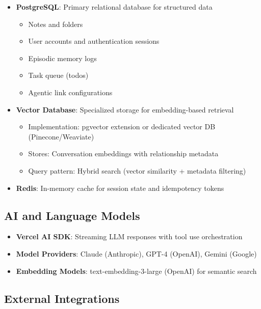 \begin{itemize}
    \item \textbf{PostgreSQL}: Primary relational database for structured data
    \begin{itemize}
        \item Notes and folders
        \item User accounts and authentication sessions
        \item Episodic memory logs
        \item Task queue (todos)
        \item Agentic link configurations
    \end{itemize}

    \item \textbf{Vector Database}: Specialized storage for embedding-based retrieval
    \begin{itemize}
        \item Implementation: pgvector extension or dedicated vector DB (Pinecone/Weaviate)
        \item Stores: Conversation embeddings with relationship metadata
        \item Query pattern: Hybrid search (vector similarity + metadata filtering)
    \end{itemize}

    \item \textbf{Redis}: In-memory cache for session state and idempotency tokens
\end{itemize}

\subsection{AI and Language Models}

\begin{itemize}
    \item \textbf{Vercel AI SDK}: Streaming LLM responses with tool use orchestration
    \item \textbf{Model Providers}: Claude (Anthropic), GPT-4 (OpenAI), Gemini (Google)
    \item \textbf{Embedding Models}: text-embedding-3-large (OpenAI) for semantic search
\end{itemize}

\subsection{External Integrations}


